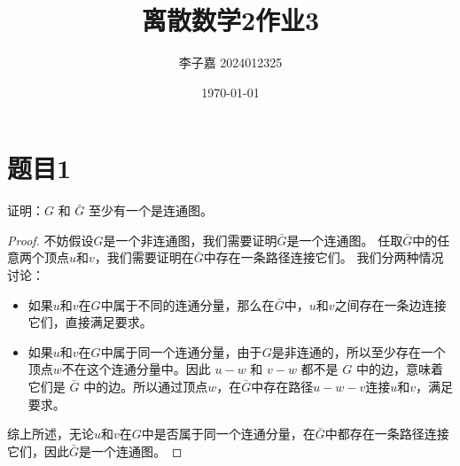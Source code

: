 \documentclass[utf8]{ctexart}
\title{\textbf{离散数学2\quad 作业3}}
\date{\today}
\author{李子嘉 2024012325}
\theoremstyle{mystyle}
\begin{document}
\maketitle

\section*{题目1}

\begin{problembox}
证明：$G$ 和 $ \bar G$ 至少有一个是连通图。
\end{problembox}

\begin{proof}
不妨假设$G$是一个非连通图，我们需要证明$\bar G$是一个连通图。
任取$\bar G$中的任意两个顶点$u$和$v$，我们需要证明在$\bar G$中存在一条路径连接它们。
我们分两种情况讨论：
\begin{itemize}
    \item 如果$u$和$v$在$G$中属于不同的连通分量，那么在$\bar G$中，$u$和$v$之间存在一条边连接它们，直接满足要求。
    \item 如果$u$和$v$在$G$中属于同一个连通分量，由于$G$是非连通的，所以至少存在一个顶点$w$不在这个连通分量中。因此 $ u-w $ 和 $ v-w $ 都不是 $G$ 中的边，意味着它们是 $\bar G$ 中的边。所以通过顶点$w$，在$\bar G$中存在路径$u-w-v$连接$u$和$v$，满足要求。
\end{itemize}
综上所述，无论$u$和$v$在$G$中是否属于同一个连通分量，在$\bar G$中都存在一条路径连接它们，因此$\bar G$是一个连通图。
\end{proof}
\end{document}

